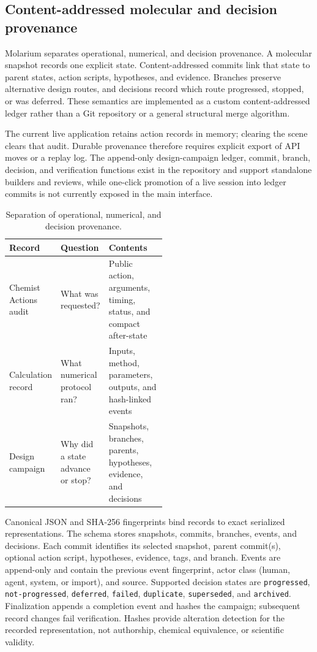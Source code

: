 \documentclass[11pt]{article}
\begin{document}
\begin{small}
\subsection{Content-addressed molecular and decision provenance}

Molarium separates operational, numerical, and decision provenance. A molecular snapshot records one explicit state. Content-addressed commits link that state to parent states, action scripts, hypotheses, and evidence. Branches preserve alternative design routes, and decisions record which route progressed, stopped, or was deferred. These semantics are implemented as a custom content-addressed ledger rather than a Git repository or a general structural merge algorithm.

The current live application retains action records in memory; clearing the scene clears that audit. Durable provenance therefore requires explicit export of API moves or a replay log. The append-only design-campaign ledger, commit, branch, decision, and verification functions exist in the repository and support standalone builders and reviews, while one-click promotion of a live session into ledger commits is not currently exposed in the main interface.

\begin{table}[htbp]
\centering\small
\caption{Separation of operational, numerical, and decision provenance.}
\label{tab:appA_provenance}
\begin{tabularx}{\linewidth}{@{}p{0.24\linewidth}p{0.27\linewidth}X@{}}
\toprule
\textbf{Record} & \textbf{Question} & \textbf{Contents}\\
\midrule
Chemist Actions audit & What was requested? & Public action, arguments, timing, status, and compact after-state\\
Calculation record & What numerical protocol ran? & Inputs, method, parameters, outputs, and hash-linked events\\
Design campaign & Why did a state advance or stop? & Snapshots, branches, parents, hypotheses, evidence, and decisions\\
\bottomrule
\end{tabularx}
\end{table}

Canonical JSON and SHA-256 fingerprints bind records to exact serialized representations. The  schema stores snapshots, commits, branches, events, and decisions. Each commit identifies its selected snapshot, parent commit(s), optional action script, hypotheses, evidence, tags, and branch. Events are append-only and contain the previous event fingerprint, actor class (human, agent, system, or import), and source. Supported decision states are \texttt{progressed}, \texttt{not-progressed}, \texttt{deferred}, \texttt{failed}, \texttt{duplicate}, \texttt{superseded}, and \texttt{archived}. Finalization appends a completion event and hashes the campaign; subsequent record changes fail verification. Hashes provide alteration detection for the recorded representation, not authorship, chemical equivalence, or scientific validity.


\end{small}
\end{document}
